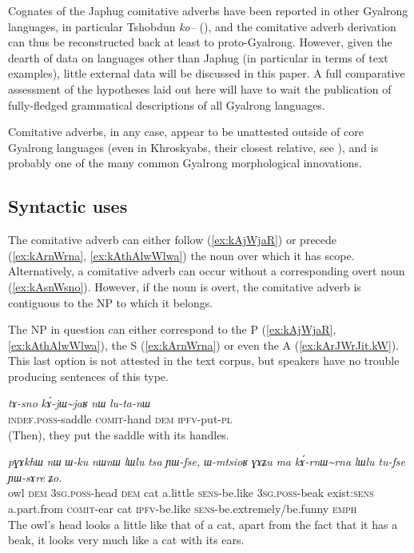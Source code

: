 \documentclass[oldfontcommands,oneside,a4paper,11pt]{article}
\newcommand{\ipa}[1]{{\phon\textit{#1}}} %
\newcommand{\tld}{\textasciitilde{}}
\begin{document}
Cognates of the Japhug comitative adverbs have been reported in other Gyalrong languages, in particular Tshobdun \ipa{ko--} (\citealt[107]{jackson98morphology}), and the comitative adverb derivation can thus be reconstructed back at least to proto-Gyalrong. However, given the dearth of data on languages other than Japhug (in particular in terms of text examples), little external data will be discussed in this paper. A full comparative assessment of the hypotheses laid out here will have to wait the publication of fully-fledged grammatical descriptions of all Gyalrong languages. 

Comitative adverbs, in any case, appear to be unattested outside of core Gyalrong languages (even in Khroskyabs, their closest relative, see \citealt{lai13affixale}), and is probably one of the many common Gyalrong  morphological innovations.

\subsection{Syntactic uses} 

The comitative adverb can either follow (\ref{ex:kAjWjaR}) or precede (\ref{ex:kArnWrna}, \ref{ex:kAthAlwWlwa}) the noun over which it has scope. Alternatively, a comitative adverb can occur without a corresponding overt noun (\ref{ex:kAsnWsno}). However, if the noun is overt, the comitative adverb is contiguous to the NP to which it belongs. 

The NP in question can either correspond to the P (\ref{ex:kAjWjaR}, \ref{ex:kAthAlwWlwa}), the S (\ref{ex:kArnWrna}) or even the A (\ref{ex:kArJWrJit.kW}). This last option is not attested in the text corpus, but speakers have no trouble producing sentences of this type.

\begin{exe}
\ex \label{ex:kAjWjaR}
\gll
\ipa{tɤ-sno}  	\ipa{kɤ́-jɯ\tld{}jaʁ}  	\ipa{nɯ}  	\ipa{lu-ta-nɯ}  \\
\textsc{indef.poss}-saddle \textsc{comit}-hand \textsc{dem} \textsc{ipfv}-put-\textsc{pl} \\
\glt (Then), they put the saddle with its handles.
\end{exe}

\begin{exe}
\ex \label{ex:kArnWrna}
\gll
\ipa{pɣɤkhɯ}  	\ipa{nɯ}  	\ipa{ɯ-ku}  	\ipa{nɯnɯ}  	\ipa{lɯlu}  	\ipa{tsa}  	\ipa{ɲɯ-fse,}  	\ipa{ɯ-mtsioʁ}  	\ipa{ɣɤʑu}  	\ipa{ma}  \ipa{kɤ́-rnɯ\tld{}rna}  	\ipa{lɯlu}  	\ipa{tu-fse}  	\ipa{ɲɯ-sɤre}  	\ipa{ʑo.}  \\
owl \textsc{dem} \textsc{3sg.poss}-head \textsc{dem} cat a.little \textsc{sens}-be.like \textsc{3sg.poss}-beak exist:\textsc{sens} a.part.from \textsc{comit}-ear cat \textsc{ipfv}-be.like \textsc{sens}-be.extremely/be.funny \textsc{emph} \\
\glt The owl's head looks a little like that of a cat, apart from the fact that it has a beak, it looks very much like a cat with its ears.
\end{exe}
\end{document}

